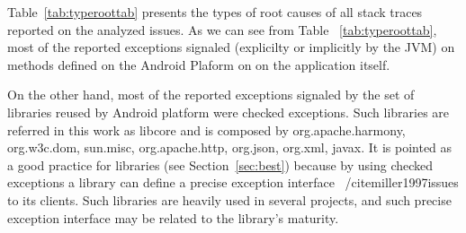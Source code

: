 \documentclass[conference]{IEEEtran}
\begin{document}
 Table~\ref{tab:typeroottab} presents the types of root causes of all stack traces reported on the analyzed issues. As we can see 
from Table ~\ref{tab:typeroottab},  most of the reported exceptions signaled (explicilty or implicitly by the JVM) on methods defined
 on the Android Plaform on on the application itself. 

On the other hand, most of the reported exceptions signaled by the set of 
libraries reused by Android platform were checked exceptions. Such libraries are referred in
this work as libcore and is composed by org.apache.harmony, org.w3c.dom, sun.misc, 
org.apache.http, org.json, org.xml, javax. It is pointed as a good practice
for libraries (see Section~\ref{sec:best}) because by using checked exceptions
a library can define a precise exception interface ~/cite{miller1997issues} to its clients. Such
libraries are heavily used in several projects, and such precise exception
interface may be related to the library's maturity.





\end{document}
